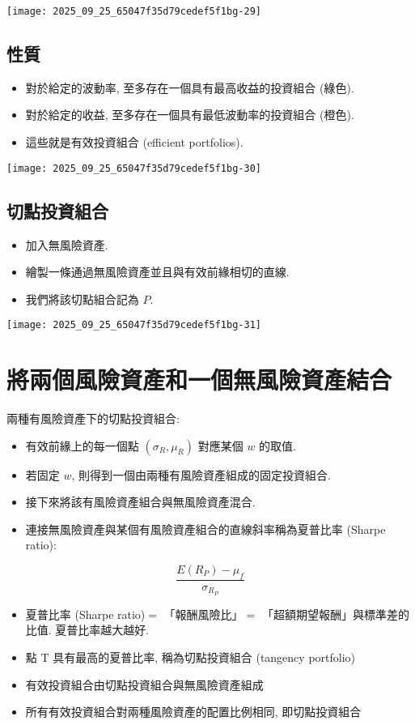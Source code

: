 \documentclass[letterpaper]{article}
\begin{document}
		
		\texttt{[image: 2025\_09\_25\_65047f35d79cedef5f1bg-29]}
		
		\subsection{性質}
		\begin{itemize}
			\item 對於給定的波動率, 至多存在一個具有最高收益的投資組合 (綠色).
			\item 對於給定的收益, 至多存在一個具有最低波動率的投資組合 (橙色).
			\item 這些就是有效投資組合 (efficient portfolios).
		\end{itemize}
		

		\texttt{[image: 2025\_09\_25\_65047f35d79cedef5f1bg-30]}
		
		\subsection{切點投資組合}
		\begin{itemize}
			\item 加入無風險資產.
			\item 繪製一條通過無風險資產並且與有效前緣相切的直線.
			\item 我們將該切點組合記為 $P$.
		\end{itemize}
		
		\texttt{[image: 2025\_09\_25\_65047f35d79cedef5f1bg-31]}
		
		\section{將兩個風險資產和一個無風險資產結合}
		兩種有風險資產下的切點投資組合: 
		
		\begin{itemize}
			\item 有效前緣上的每一個點 $\left (\sigma_{R}, \mu_{R}\right)$ 對應某個 $w$ 的取值.
			\item 若固定 $w$, 則得到一個由兩種有風險資產組成的固定投資組合.
			\item 接下來將該有風險資產組合與無風險資產混合.
			\item 連接無風險資產與某個有風險資產組合的直線斜率稱為夏普比率 (Sharpe ratio):
		\end{itemize}

		$$
		\frac{E\left (R_{P}\right)-\mu_{f}}{\sigma_{R_{P}}}
		$$
		
		\begin{itemize}
			\item 夏普比率 (Sharpe ratio)$=$ 「報酬風險比」$=$ 「超額期望報酬」與標準差的比值. 夏普比率越大越好.
			\item 點 T 具有最高的夏普比率, 稱為切點投資組合 (tangency portfolio)
			\item 有效投資組合由切點投資組合與無風險資產組成
			\item 所有有效投資組合對兩種風險資產的配置比例相同, 即切點投資組合
		\end{itemize}
		
		
	
\end{document}
